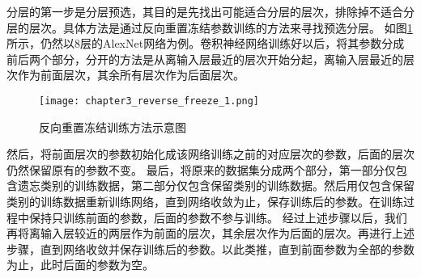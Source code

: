 分层的第一步是分层预选，其目的是先找出可能适合分层的层次，排除掉不适合分层的层次。具体方法是通过反向重置冻结参数训练的方法来寻找预选分层。
如图\ref{fig:chapter3_reverse_freeze_1}所示，仍然以8层的AlexNet网络为例。卷积神经网络训练好以后，将其参数分成前后两个部分，分开的方法是从离输入层最近的层次开始分起，离输入层最近的层次作为前面层次，其余所有层次作为后面层次。
\begin{figure}
    \centering
    \texttt{[image: chapter3\_reverse\_freeze\_1.png]}
    \caption{反向重置冻结训练方法示意图}
    \label{fig:chapter3_reverse_freeze_1}
\end{figure}
然后，将前面层次的参数初始化成该网络训练之前的对应层次的参数，后面的层次仍然保留原有的参数不变。
最后，将原来的数据集分成两个部分，第一部分仅包含遗忘类别的训练数据，第二部分仅包含保留类别的训练数据。然后用仅包含保留类别的训练数据重新训练网络，直到网络收敛为止，保存训练后的参数。在训练过程中保持只训练前面的参数，后面的参数不参与训练。
经过上述步骤以后，我们再将离输入层较近的两层作为前面的层次，其余层次作为后面的层次。再进行上述步骤，直到网络收敛并保存训练后的参数。以此类推，直到前面参数为全部的参数为止，此时后面的参数为空。

